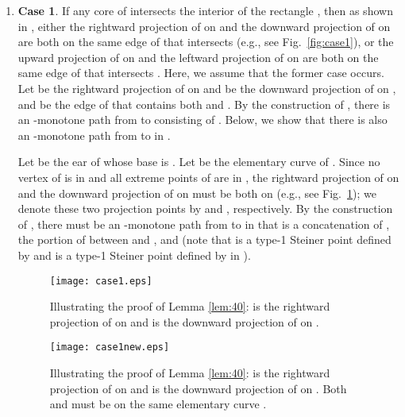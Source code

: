 \documentclass[english,runningheads,11pt]{llncs}
\newenvironment{proof}{\noindent {\textbf{Proof:}}\rm}{\hfill \rm}
\begin{document}
\begin{proof}
\begin{enumerate}
\item
{\bf Case 1}.
If any core of  intersects the interior of the
rectangle , then as shown in
\cite{ref:ClarksonRe87,ref:ClarksonRe88}, either the rightward projection
of  on  and the downward projection of  on
 are both on the same edge of 
that intersects  (e.g., see Fig.~\ref{fig:case1}),
or the upward projection
of  on  and the leftward projection of  on
 are both on the same edge of  that intersects
.  Here, we assume that the former case
occurs. Let  be the rightward projection
of  on  and  be the downward projection of  on
, and  be the edge of  that
contains both  and .
By the construction of , there is an
-monotone path from  to  consisting of
. Below, we show
that there is also an -monotone path from  to  in
.

Let  be the ear of  whose base is
. Let  be the elementary curve of
. Since no vertex of  is in 
and all extreme points of  are in , the rightward
projection of  on  and the downward projection of
 on  must be both on  (e.g., see
Fig.~\ref{fig:case1new}); we denote these two
projection points by  and , respectively. By the
construction of , there must be an -monotone path
from  to  in  that is a concatenation of
, the portion of  between  and , and
 (note that  is a type-1 Steiner point defined by  and  is a type-1
Steiner point defined by  in ).


\begin{figure}[t]
\begin{minipage}[t]{0.49\linewidth}
\begin{center}
\texttt{[image: case1.eps]}
\caption{\footnotesize Illustrating the proof of Lemma \ref{lem:40}:
 is the rightward projection of  on  and 
is the downward projection of  on .}
\label{fig:case1}
\end{center}
\end{minipage}
\hspace*{0.04in}
\begin{minipage}[t]{0.49\linewidth}
\begin{center}
\texttt{[image: case1new.eps]}
\caption{\footnotesize Illustrating the proof of Lemma \ref{lem:40}:
 is the rightward projection of  on  and 
is the downward projection of  on . Both  and
 must be on the same elementary curve .}
\label{fig:case1new}
\end{center}
\end{minipage}
\vspace*{-0.15in}
\end{figure}


\end{enumerate}
\end{proof}
\end{document}

